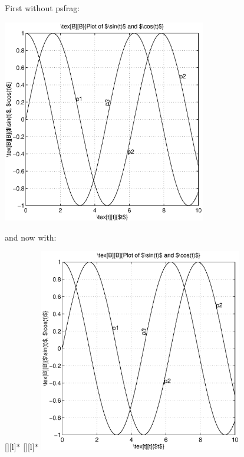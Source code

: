 



First without psfrag:

        \includegraphics[width=3.5in]{example.eps}

and now with:

        \psfragscanon
        [][l]{$\ast$}
        [][l]{$\ast$}
        \includegraphics[width=3.5in]{example.eps}


\bye
